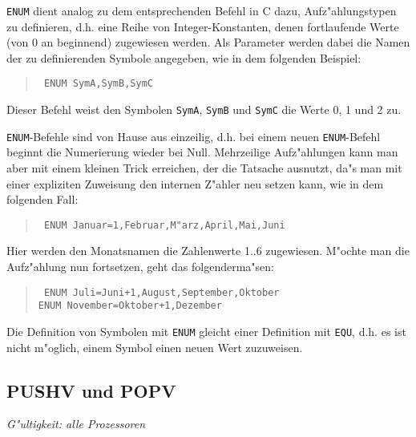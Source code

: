 \documentclass[12pt,a4paper,twoside]{report}
\makeatletter
\newcommand{\tty}[1]{{\tt #1}}
\newcommand{\ttindex}[1]{\index{#1@{\tt #1}}}
\makeatother
\begin{document}
\tty{ENUM} dient analog zu dem entsprechenden Befehl in C dazu,
Aufz"ahlungstypen zu definieren, d.h. eine Reihe von Integer-Konstanten,
denen fortlaufende Werte (von 0 an beginnend) zugewiesen
werden. Als Parameter werden dabei die Namen der zu definierenden
Symbole angegeben, wie in dem folgenden Beispiel:
\begin{quote}{\tt
        ENUM    SymA,SymB,SymC}
\end{quote}
Dieser Befehl weist den Symbolen \tty{SymA}, \tty{SymB} und \tty{SymC}
die Werte 0, 1 und 2 zu.
\par
\tty{ENUM}-Befehle sind von Hause aus einzeilig, d.h. bei einem neuen
\tty{ENUM}-Befehl beginnt die Numerierung wieder bei Null.  Mehrzeilige
Aufz"ahlungen kann man aber mit einem kleinen Trick erreichen, der
die Tatsache ausnutzt, da"s man mit einer expliziten Zuweisung den
internen Z"ahler neu setzen kann, wie in dem folgenden Fall:
\begin{quote}{\tt
        ENUM    Januar=1,Februar,M"arz,April,Mai,Juni}
\end{quote}
Hier werden den Monatsnamen die Zahlenwerte 1..6
zugewiesen.  M"ochte man die Aufz"ahlung nun fortsetzen, geht
das folgenderma"sen:
\begin{quote}{\tt
        ENUM    Juli=Juni+1,August,September,Oktober \\
        ENUM    November=Oktober+1,Dezember
}\end{quote}
Die Definition von Symbolen mit \tty{ENUM} gleicht einer Definition
mit \tty{EQU}, d.h. es ist nicht m"oglich, einem Symbol einen neuen
Wert zuzuweisen.


\subsection{PUSHV und POPV}
\ttindex{PUSHV}\ttindex{POPV}

{\em G"ultigkeit: alle Prozessoren}
\end{document}
